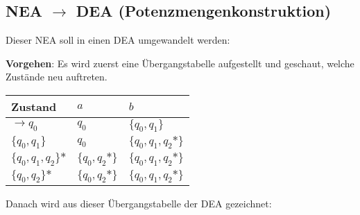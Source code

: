 \subsection{NEA $\rightarrow$ DEA (Potenzmengenkonstruktion)}
Dieser NEA soll in einen DEA umgewandelt werden:
\begin{figure}[H]
    \centering
    \begin{transitiongraph}[fa]
    \end{transitiongraph}
    \label{graph:NEA_LaTeX}
\end{figure}
\sloppy
\textbf{Vorgehen}: Es wird zuerst eine Übergangstabelle aufgestellt und geschaut, welche Zustände neu auftreten.
\fussy
\begin{table}[H]
\begin{tabular}{|l|l|l|}
\hline
Zustand             & $a$              & $b$                   \\
\hline
$\to q_0$           & $q_0$           & $\{q_0,q_1\}$       \\
\hline
$\{q_0,q_1\}$       & $q_0$           & $\{q_0,q_1,q_2\mbox{*}\}$ \\
\hline
$\{q_0,q_1,q_2\}\mbox{*}$ & $\{q_0,q_2\mbox{*}\}$ & $\{q_0,q_1,q_2\mbox{*}\}$   \\
\hline
$\{q_0,q_2\}\mbox{*}$      & $\{q_0,q_2\mbox{*}\}$ & $\{q_0,q_1,q_2\mbox{*}\}$ \\
\hline
\end{tabular}
\end{table}
Danach wird aus dieser Übergangstabelle der DEA gezeichnet:\\
\begin{figure}[H]
    \centering
    \begin{transitiongraph}[fa]
    \end{transitiongraph}
\end{figure}